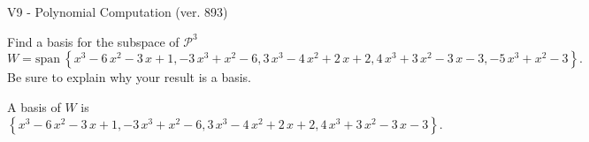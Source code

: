 \begin{exercise}
  \begin{exerciseTitle}V9 - Polynomial Computation (ver. 893)\end{exerciseTitle}
  \begin{exerciseStatement}
    Find a basis for the subspace of \(\mathcal{P}^3\) 
\[W=\mathrm{span}\ \left\{x^{3} - 6 \, x^{2} - 3 \, x + 1 , -3 \, x^{3} + x^{2} - 6 , 3 \, x^{3} - 4 \, x^{2} + 2 \, x + 2 , 4 \, x^{3} + 3 \, x^{2} - 3 \, x - 3 , -5 \, x^{3} + x^{2} - 3\right\}.\]
 Be sure to explain why your result is a basis.


  \end{exerciseStatement}
  \begin{exerciseAnswer}
   A basis of \(W\) is  \(\left\{x^{3} - 6 \, x^{2} - 3 \, x + 1 , -3 \, x^{3} + x^{2} - 6 , 3 \, x^{3} - 4 \, x^{2} + 2 \, x + 2 , 4 \, x^{3} + 3 \, x^{2} - 3 \, x - 3\right\}\).
  


  \end{exerciseAnswer}
\end{exercise}